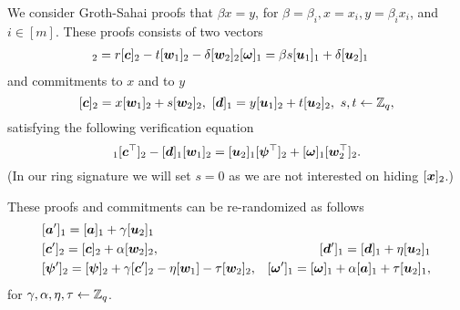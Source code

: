
We consider Groth-Sahai proofs that $\beta x=y$, for $\beta=\beta_i,x=x_i,y=\beta_ix_i$, and $i\in[m]$. These proofs  consists of two vectors
\begin{align}
[&\vecb{\psi}]_2=r[\vecb{c}]_2-t[\vecb{w}_1]_2-\delta[\vecb{w}_2]_2 &[\vecb{\omega}]_1 =\beta s[\vecb{u}_1]_1+\delta[\vecb{u}_2]_1
\label{eq:wi-proofs}
\end{align}
and commitments to $x$ and to $y$
$$
[{\boldsymbol{c}}]_2= x[{\boldsymbol{w}}_1]_2+s[{\boldsymbol{w}}_2]_2,\ [{\boldsymbol{d}}]_1 =y[{\boldsymbol{u}}_1]_2 + t[{\boldsymbol{u}}_2]_2,\ s,t\gets\mathbb{Z}_q,
$$
satisfying the following verification equation
\begin{equation}
[\vecb{a}]_1[\vecb{c}^\top]_2-[\vecb{d}]_1[\vecb{w}_1]_2 =[\vecb{u}_2]_1[\vecb{\psi}^\top]_2+[\vecb{\omega}]_1[\vecb{w}^\top_2]_2.
\label{eq:wi-verif}
\end{equation}
(In our ring signature we will set $s=0$ as we are not interested on hiding $[{\boldsymbol{x}}]_2$.)

These proofs and commitments can be re-randomized as follows
\begin{align}
&[{\boldsymbol{a}}']_1 = [{\boldsymbol{a}}]_1 + \gamma[{\boldsymbol{u}}_2]_1 \nonumber\\
&[{\boldsymbol{c}}']_2= [{\boldsymbol{c}}]_2 + \alpha[{\boldsymbol{w}}_2]_2, &[{\boldsymbol{d}}']_1 =[{\boldsymbol{d}}]_1 + \eta[{\boldsymbol{u}}_2]_1 \nonumber\\
&[{\boldsymbol{\psi}}']_2=[{\boldsymbol{\psi}}]_2+\gamma[{\boldsymbol{c}}']_2 - \eta[{\boldsymbol{w}}_1]-\tau[{\boldsymbol{w}}_2]_2, & [{\boldsymbol{\omega}}']_1 = [{\boldsymbol{\omega}}]_1 + \alpha[{\boldsymbol{a}}]_1+\tau[{\boldsymbol{u}}_2]_1,
\label{eq:wi-rerand}
\end{align}
for $\gamma,\alpha,\eta,\tau\gets\mathbb{Z}_q$.

